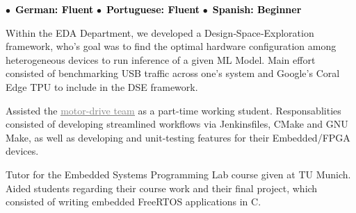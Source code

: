 \documentclass[10pt,a4paper,ragged2e,withhyper]{altacv}
\begin{document}
\begin{paracol}{2}
    $\bullet$\ \textbf{\textcolor{black}{German: Fluent}} \hfill $\bullet$\ \textbf{\textcolor{black}{Portuguese: Fluent}} \hfill $\bullet$\ \textbf{\textcolor{black}{Spanish: Beginner}}


%
%


\medskip

\nocite{*}

\switchcolumn
{}

Within the EDA Department, we developed a Design‑Space‑Exploration framework, 
who's goal was to find the optimal hardware configuration among heterogeneous devices to run inference of a given ML Model.
Main effort consisted of benchmarking USB traffic across one's system and Google's Coral Edge TPU to include in the DSE framework.

\divider

Assisted the \href{https://molabo.com/unternehmen/}{{\textcolor{gray}{\underline{motor-drive team}}}}
as a part-time working student. Responsablities consisted of
developing streamlined workflows via Jenkinsfiles, CMake and GNU Make, as well as 
developing and unit-testing features for their Embedded/FPGA devices.

\divider

Tutor for the Embedded Systems Programming Lab course given at TU Munich.
Aided students regarding their course work and their final project, which 
consisted of writing embedded FreeRTOS applications in C.


\end{paracol}
\end{document}
